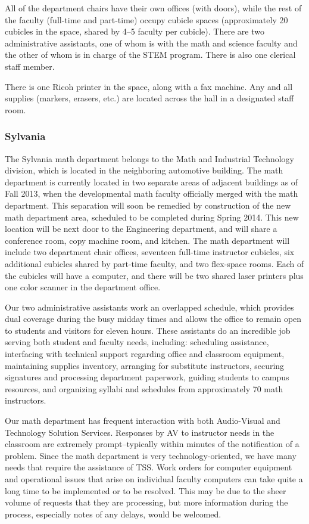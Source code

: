 All of the department chairs have their own offices (with doors), while the
rest of the faculty (full-time and part-time) occupy cubicle spaces
(approximately 20 cubicles in the space, shared by 4--5 faculty per cubicle).
There are two administrative assistants, one of whom is with the math and
science faculty and the other of whom is in charge of the STEM program.  There
is also one clerical staff member.

There is one Ricoh printer in the space, along with a fax machine.  Any and all
supplies (markers, erasers, etc.) are located across the hall in a designated
staff room.

\subsubsection{Sylvania}
The Sylvania math department belongs to the Math and Industrial Technology
division, which is located in the neighboring automotive building.  The math
department is currently located in two separate areas of adjacent buildings as
of Fall 2013, when the developmental math faculty officially merged with the
math department.  This separation will soon be remedied by construction of the
new math department area, scheduled to be completed during Spring 2014.  This
new location will be next door to the Engineering department, and will share a
conference room, copy machine room, and kitchen. The math department will
include two department chair offices, seventeen full-time instructor cubicles,
six additional cubicles shared by part-time faculty, and two flex-space rooms.
Each of the cubicles will have a computer, and there will be two shared laser
printers plus one color scanner in the department office.

Our two administrative assistants work an overlapped schedule, which provides
dual coverage during the busy midday times and allows the office to remain
open to students and visitors for eleven hours.  These assistants do an
incredible job serving both student and faculty needs, including:  scheduling
assistance, interfacing with technical support regarding office and classroom
equipment, maintaining supplies inventory, arranging for substitute
instructors, securing signatures and processing department paperwork, guiding
students to campus resources, and organizing syllabi and schedules from
approximately 70 math instructors.

Our math department has frequent interaction with both Audio-Visual and
Technology Solution Services.  Responses by AV to instructor needs in the
classroom are extremely prompt--typically within minutes of the notification of
a problem.  Since the math department is very technology-oriented, we have many
needs that require the assistance of TSS.  Work orders for computer equipment
and operational issues that arise on individual faculty computers can take
quite a long time to be implemented or to be resolved.  This may be due to the
sheer volume of requests that they are processing, but more information during
the process, especially notes of any delays, would be welcomed.

